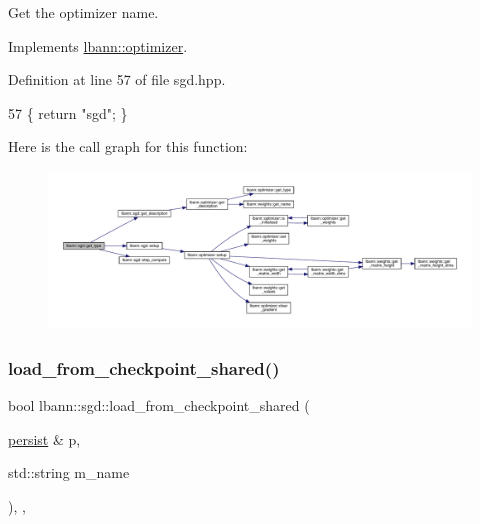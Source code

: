 Get the optimizer name. 

Implements \hyperlink{classlbann_1_1optimizer_a7b7a6814e14eeee157e1cbb7f15dd4ff}{lbann\+::optimizer}.



Definition at line 57 of file sgd.\+hpp.


\begin{DoxyCode}
57 \{ \textcolor{keywordflow}{return} \textcolor{stringliteral}{"sgd"}; \}
\end{DoxyCode}
Here is the call graph for this function\+:\nopagebreak
\begin{figure}[H]
\begin{center}
\leavevmode
\includegraphics[width=350pt]{classlbann_1_1sgd_ad24efbeadae61890d07fa9e95aa91c61_cgraph}
\end{center}
\end{figure}
\mbox{\label{classlbann_1_1sgd_aa3e3237a59b0593d7caf7357b7c181cf}} 
\subsubsection{\texorpdfstring{load\+\_\+from\+\_\+checkpoint\+\_\+shared()}{load\_from\_checkpoint\_shared()}}
{\footnotesize\ttfamily bool lbann\+::sgd\+::load\+\_\+from\+\_\+checkpoint\+\_\+shared (\begin{DoxyParamCaption}\item[{\hyperlink{classlbann_1_1persist}{persist} \&}]{p,  }\item[{std\+::string}]{m\+\_\+name }\end{DoxyParamCaption})\hspace{0.3cm}{\ttfamily [override]}, {\ttfamily [private]}, {\ttfamily [virtual]}}



